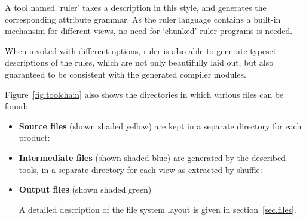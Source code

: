 \begin{itemize}
A tool named `ruler' takes a description in this style, and generates the
corresponding attribute grammar.
As the ruler language contains a built-in mechansim for different views, 
no need for `chunked' ruler programs is needed.

When invoked with different options, ruler is also able to
generate typeset descriptions of the rules, which are not only
beautifully laid out, but also guaranteed to be consistent with
the generated compiler modules.
 
\end{itemize}

\newpage
Figure~\ref{fig.toolchain} also shows the directories in which various files can be found:
\begin{itemize}
\item {\bf Source files} (shown shaded yellow)
are kept in a separate directory for each product:

\item {\bf Intermediate files} (shown shaded blue)
are generated by the described tools, in a separate directory for each view
as extracted by shuffle:

\item {\bf Output files} (shown shaded green)

A detailed description of the file system layout is given in section~\ref{sec.files}.


\end{itemize}




